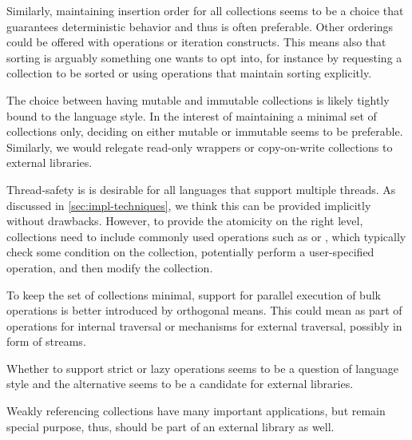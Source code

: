 \documentclass[sigconf, 10pt]{acmart}
\begin{document}
Similarly, maintaining insertion order for all collections seems to be a choice
that guarantees deterministic behavior and thus is often preferable.
Other orderings could be offered with operations or iteration constructs.
This means also that sorting is arguably something one wants to opt into,
for instance by requesting a collection to be sorted or using operations that
maintain sorting explicitly.

The choice between having mutable and immutable collections is likely tightly
bound to the language style.
In the interest of maintaining a minimal set of collections only,
deciding on either mutable or immutable seems to be preferable.
Similarly, we would relegate read-only wrappers or copy-on-write collections
to external libraries.

Thread-safety is is desirable for all languages that support multiple threads.
As discussed in \cref{sec:impl-techniques},
we think this can be provided implicitly without drawbacks.
However, to provide the atomicity on the right level,
collections need to include commonly used operations
such as  or ,
which typically check some condition on the collection,
potentially perform a user-specified operation, and then modify the collection.


To keep the set of collections minimal,
support for parallel execution of bulk operations is
better introduced by orthogonal means.
This could mean as part of operations for internal traversal
or mechanisms for external traversal, possibly in form of streams.

Whether to support strict or lazy operations seems
to be a question of language style
and the alternative seems to be a candidate for external libraries.

Weakly referencing collections have many important applications,
but remain special purpose, thus, should be part of an external library as well.
\end{document}
